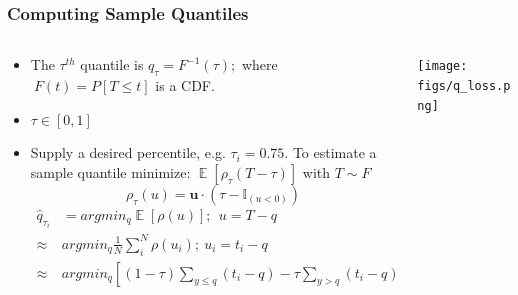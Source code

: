\documentclass[t, pdftex]{beamer}
\DeclareMathOperator*{\E}{\mathbb{E}}
\begin{document}
\begin{frame}[shrink=20]
\frametitle{Computing Sample Quantiles}
\begin{columns}
\begin{column}{0.5\textwidth}
\begin{itemize}
\item The $\tau^{th}$ quantile is $q_\tau = F^{-1}(\tau); $ where $\ F(t)=P[T \leq t]$ is a CDF.
\item $\tau \in [0, 1]$
\item Supply a desired percentile, e.g. $\tau_i = 0.75$.
To estimate a sample quantile minimize: $\E[\rho_\tau(T - \tau)]$ with $T \sim F$
\[
\rho_\tau( u) = \mathbf u \cdot (\tau - \mathbb{I}_{( u < 0)})
\]
\begin{equation}
\left.\begin{aligned}
\hat q_{\tau_i} &= argmin_{q} \E[\rho(u)];\ \  u = T - q  \\
\approx & argmin_q  \frac{1}{N} \sum_i^N \rho(u_i); \ u_i = t_i - q \\
\approx & argmin_q \left[ (1-\tau) \sum_{y \leq q}( t_i - q ) - \tau \sum_{y > q} (t_i - q) \right]
\end{aligned}\right. \nonumber
\end{equation}
\end{itemize}
\end{column}
\begin{column}{0.5\textwidth}  %
    \begin{center}
     \texttt{[image: figs/q\_loss.png]}
     \end{center}
\end{column}
\end{columns}
\end{frame}
\end{document}
